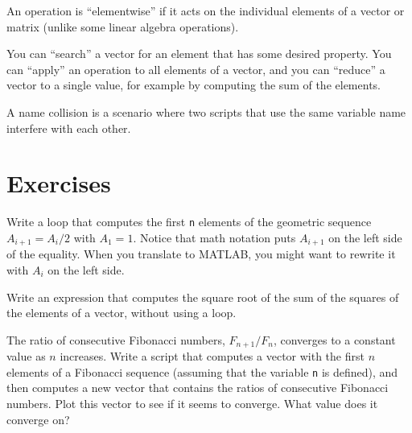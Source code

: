 An operation is ``elementwise'' if it acts on the individual elements of a vector or matrix (unlike some linear algebra operations).

You can ``search'' a vector for an element that has some desired property.
You can ``apply'' an operation to all elements of a vector, and you can ``reduce'' a vector
to a single value, for example by computing the sum of the elements.

A name collision is a scenario where two scripts that use the same variable name interfere with each other.


\section{Exercises}

\begin{ex}
Write a loop that computes the first {\tt n} elements
of the geometric sequence $A_{i+1} = A_i/2$ with $A_1 = 1$.  Notice that
math notation puts $A_{i+1}$ on the left side of the equality.
When you translate to MATLAB, you might want to rewrite it with
$A_{i}$ on the left side.
\end{ex}

\begin{ex}
Write an expression that computes the square root of the sum of the squares of the elements of a vector, without using a loop.

\end{ex}

\begin{ex}
\label{fibratio}

The ratio of consecutive Fibonacci numbers, $F_{n+1}/F_{n}$, converges
to a constant value as $n$ increases.  Write a script that computes
a vector with the first $n$ elements of a Fibonacci sequence (assuming
that the variable {\tt n} is defined), and then computes a new
vector that contains the ratios of consecutive Fibonacci numbers.
Plot this vector to see if it seems to converge.  What value does
it converge on?


\end{ex}


